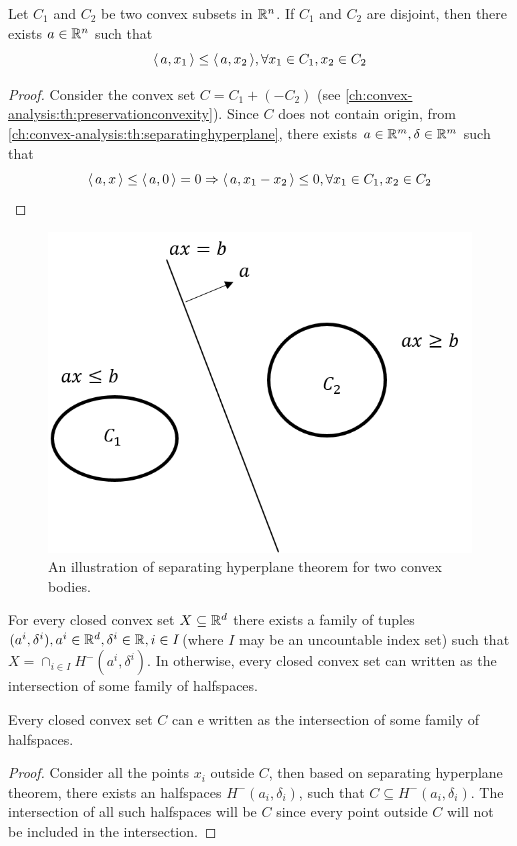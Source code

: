 \begin{refsection}
\begin{corollary} Let $C_1$ and $C_2$ be two convex subsets in $\mathbb{R}^n$. If $C_1$ and $C_2$ are disjoint, then there exists $a\in \mathbb{R}^n$ such that
	$${\left< \, a,x_1 \, \right>}\leq {\left< \, a,x_2 \, \right>},\forall x_1\in C_1,x_2\in C_2$$ 
\end{corollary}
\begin{proof}
	Consider the convex set $C = C_1 + (-C_2)$ (see \autoref{ch:convex-analysis:th:preservationconvexity}). Since $C$ does not contain origin, from \autoref{ch:convex-analysis:th:separatinghyperplane}, there exists $a\in \mathbb{R}^m,\delta \in \mathbb{R}^m$ such that $${\left< \, a,x \, \right>} \leq {\left< \, a,0 \, \right>} = 0 \Rightarrow {\left< \, a,x_1-x_2 \, \right>} \leq 0,\forall x_1\in C_1,x_2\in C_2$$ 
\end{proof}

\begin{figure}[H]
\centering
\includegraphics[width=0.5\linewidth]{figures/optimization/separingHyperplaneTheoremDemo}
\caption{An illustration of separating hyperplane theorem for two convex bodies.}
\label{fig:separingHyperplaneTheoremDemo}
\end{figure}


\begin{corollary}
	For every closed convex set $X\subseteq \mathbb{R}^d$ there exists a family of tuples $(a^i,\delta^i),a^i\in \mathbb{R}^d,\delta^i\in \mathbb{R}, i\in I$(where $I$ may be an uncountable index set) such that $X = \cap_{i\in I} H^{-}(a^i,\delta^i)$. In otherwise, every closed convex set can written as the intersection of some family of halfspaces.
\end{corollary}


\begin{corollary}
Every closed convex set $C$ can e written as the intersection of some family of halfspaces.
\end{corollary}
\begin{proof}
Consider all the points $x_i$ outside $C$, then based on separating hyperplane theorem, there exists an halfspaces $H^-(a_i,\delta_i)$, such that $C\subseteq H^-(a_i,\delta_i)$. The intersection of all such halfspaces will be $C$ since every point outside $C$ will not be included in the intersection.
\end{proof}


\end{refsection}
